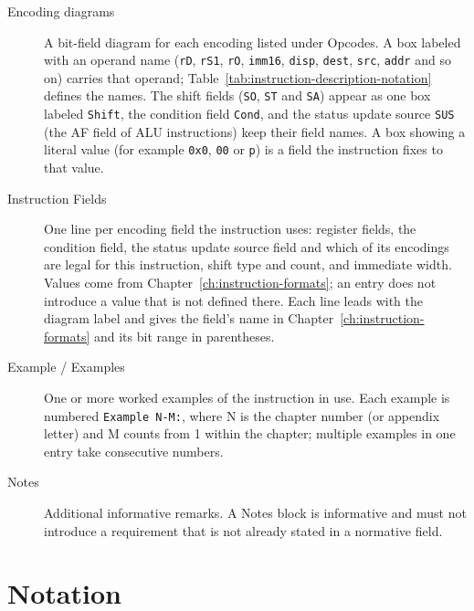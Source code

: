 \begin{description}
	\item[Encoding diagrams] A bit-field diagram for each encoding listed under Opcodes. A box labeled with an operand name
	      (\texttt{rD}, \texttt{rS1}, \texttt{rO}, \texttt{imm16}, \texttt{disp}, \texttt{dest}, \texttt{src}, \texttt{addr} and
	      so on) carries that operand; Table~\ref{tab:instruction-description-notation} defines the names. The shift fields
	      (\texttt{SO}, \texttt{ST} and \texttt{SA}) appear as one box labeled \texttt{Shift}, the condition field \texttt{Cond},
	      and the status update source \texttt{SUS} (the AF field of ALU instructions) keep their field names. A box showing a
	      literal value (for example \texttt{0x0}, \texttt{00} or \texttt{p}) is a field the instruction fixes to that value.
	\item[Instruction Fields] One line per encoding field the instruction uses: register fields, the condition field, the status
	      update source field and which of its encodings are legal for this instruction, shift type and count, and immediate
	      width. Values come from Chapter~\ref{ch:instruction-formats}; an entry does not introduce a value that is not defined
	      there. Each line leads with the diagram label and gives the field's name in Chapter~\ref{ch:instruction-formats} and
	      its bit range in parentheses.
	\item[Example / Examples] One or more worked examples of the instruction in use. Each example is numbered \texttt{Example
		      N-M:}, where N is the chapter number (or appendix letter) and M counts from 1 within the chapter; multiple examples in
	      one entry take consecutive numbers.
	\item[Notes] Additional informative remarks. A Notes block is informative and must not introduce a requirement that is not
	      already stated in a normative field.

\end{description}

\section{Notation}

